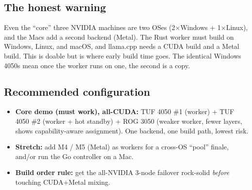 \subsection{The honest warning}
Even the ``core'' three NVIDIA machines are two OSes (2$\times$Windows + 1$\times$Linux),
and the Macs add a second backend (Metal). The Rust worker must build on
Windows, Linux, and macOS, and llama.cpp needs a CUDA build and a Metal build.
This is doable but is where early build time goes. The identical Windows 4050s
mean once the worker runs on one, the second is a copy. \HYP

\subsection{Recommended configuration}
\begin{itemize}[leftmargin=1.4em,nosep]
  \item \textbf{Core demo (must work), all-CUDA:} TUF 4050 \#1 (worker) + TUF
  4050 \#2 (worker + hot standby) + ROG 3050 (weaker worker, fewer layers,
  shows capability-aware assignment). One backend, one build path, lowest risk.
  \item \textbf{Stretch:} add M4 / M5 (Metal) as workers for a cross-OS ``pool''
  finale, and/or run the Go controller on a Mac.
  \item \textbf{Build order rule:} get the all-NVIDIA 3-node failover rock-solid
  \emph{before} touching CUDA$+$Metal mixing.
\end{itemize}
